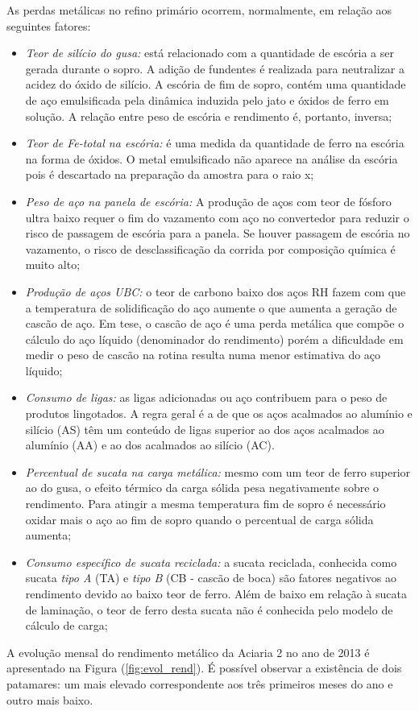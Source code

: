 \begin{multicols}{2}
	As perdas metálicas no refino primário ocorrem, normalmente, em relação aos seguintes fatores:
	\begin{itemize} \itemsep4pt \parskip0pt 
		\item{\emph{Teor de silício do gusa:} está relacionado com a quantidade de escória a ser gerada durante o sopro. A adição de fundentes é realizada para neutralizar a acidez do óxido de silício. A escória de fim de sopro, contém uma quantidade de aço emulsificada pela dinâmica induzida pelo jato e óxidos de ferro em solução. A relação entre peso de escória e rendimento é, portanto, inversa;}
		\item{\emph{Teor de Fe-total na escória:} é uma medida da quantidade de ferro na escória na forma de óxidos. O metal emulsificado não aparece na análise da escória pois é descartado na preparação da amostra para o raio x;}		
		\item{\emph{Peso de aço na panela de escória: } A produção de aços com teor de fósforo ultra baixo requer o fim do vazamento com  aço no convertedor para reduzir o risco de passagem de escória para a panela. Se houver passagem de escória no vazamento, o risco de desclassificação da corrida por composição química é muito alto;}
		\item{\emph{Produção de aços UBC:} o teor de carbono baixo dos aços RH fazem com que a temperatura de solidificação do aço aumente o que aumenta a geração de cascão de aço. Em tese, o cascão de aço é uma perda metálica que compõe o cálculo do aço líquido (denominador do rendimento) porém a dificuldade em medir o peso de cascão na rotina resulta numa menor estimativa do aço líquido;}
		\item{\emph{Consumo de ligas: } as ligas adicionadas ou aço contribuem para o peso de produtos lingotados. A regra geral é a de que os aços acalmados ao alumínio e silício (AS) têm um conteúdo de ligas superior ao dos aços acalmados ao alumínio (AA) e ao dos acalmados ao silício (AC).}
		\item{\emph{Percentual de sucata na carga metálica: } mesmo com um teor de ferro superior ao do gusa, o efeito térmico da carga sólida pesa negativamente sobre o rendimento. Para atingir a mesma temperatura fim de sopro é necessário oxidar mais o aço ao fim de sopro quando o percentual de carga sólida aumenta;}
		\item{\emph{Consumo específico de sucata reciclada: } a sucata reciclada, conhecida como sucata \textit{tipo A} (TA) e \textit{tipo B} (CB - cascão de boca) são fatores negativos ao rendimento devido ao baixo teor de ferro. Além de baixo em relação à sucata de laminação, o teor de ferro desta sucata não é conhecida pelo modelo de cálculo de carga;}
	\end{itemize}
	A evolução mensal do rendimento metálico da Aciaria 2 no ano de 2013 é apresentado na Figura (\ref{fig:evol_rend})\cite{rel2}. É possível observar a existência de dois patamares: um mais elevado correspondente aos três primeiros meses do ano e outro mais baixo. 
	

\end{multicols}
